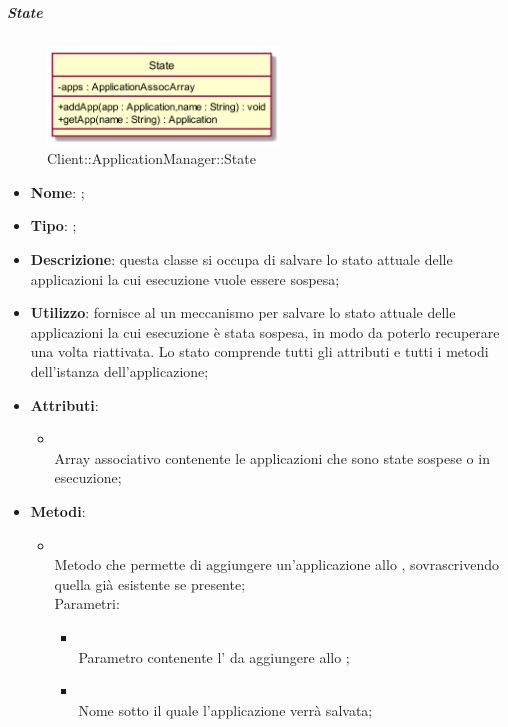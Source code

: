 \hypertarget{State_label}{\subparagraph{State}}
\begin{figure}[h]
	\centering
	\includegraphics[width=0.55\textwidth,height=\textheight,keepaspectratio]{images/ClassState.png}
	\caption{Client::ApplicationManager::State}
\end{figure}
\begin{itemize}
	\item \textbf{Nome}: ;
	\item \textbf{Tipo}: ;
	\item \textbf{Descrizione}: questa classe si occupa di salvare lo stato attuale delle applicazioni la cui esecuzione vuole essere sospesa;
	\item \textbf{Utilizzo}: fornisce al  un meccanismo per salvare lo stato attuale delle applicazioni la cui esecuzione è stata sospesa, in modo da poterlo recuperare una volta riattivata. Lo stato comprende tutti gli attributi e tutti i metodi dell'istanza dell'applicazione;
	\item \textbf{Attributi}:
	\begin{itemize}
		\item[]  \\
		Array associativo contenente le applicazioni che sono state sospese o in esecuzione;
	\end{itemize}
	\item \textbf{Metodi}:
	\begin{itemize}
		\item[]  \\		Metodo che permette di aggiungere un'applicazione allo , sovrascrivendo quella già esistente se presente;\\
		Parametri:
		\begin{itemize}
			\item {} \\
			Parametro contenente l' da aggiungere allo ;
			\item {} \\
			Nome sotto il quale l'applicazione verrà salvata;

\end{itemize}
\end{itemize}
\end{itemize}
